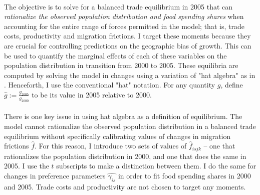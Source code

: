 \documentclass[]{article}
\theoremstyle{plain}
\begin{document}
\paragraph*{}
 The objective is to solve for a balanced trade equilibrium in 2005 that can \textit{rationalize the observed population distribution and food spending shares} when accounting for the entire range of forces permitted in the model; that is, trade costs, productivity and migration frictions. I target these moments because they are crucial for controlling predictions on the geographic bias of growth. This can be used to quantify the marginal effects of each of these variables on the population distribution in transition from 2000 to 2005. These equilibria are computed by solving the model in changes using a variation of "hat algebra" as in \citet*{dekle}. Henceforth, I use the conventional "hat" notation. For any quantity $g$, define $\hat{g} := \frac{g_{2005}}{g_{2000}}$ to be its value in 2005 relative to 2000. 
 \paragraph*{}
   There is one key issue in using hat algebra as a definition of equilibrium. The model cannot rationalize the observed population distribution in a balanced trade equilibrium without specifically calibrating values of changes in migration frictions $\hat{f}$. For this reason, I introduce two sets of values of $\hat{f}_{isjk}$ -- one that rationalizes the population distribution in 2000, and one that does the same in 2005. I use the $t$ subscripts to make a distinction between them. I do the same for changes in preference parameters $\hat{\gamma_{is}}$ in order to fit food spending shares in 2000 and 2005. Trade costs and productivity are not chosen to target any moments.
\end{document}
